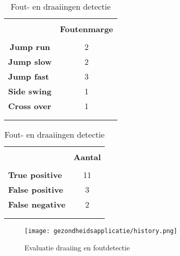 \begin{table}[!htpd]
\parbox{.45\linewidth}{
    \centering
    \begin{tabular}{lc}
 \hline \\
    \multicolumn{1}{c}{\textbf{}}          & \textbf{Foutenmarge} \\
     \hline \\
    \multicolumn{1}{c}{\textbf{Jump run}}  & 2                    \\
    \multicolumn{1}{c}{\textbf{Jump slow}} & 2                    \\
    \textbf{Jump fast}                     & 3                    \\
    \textbf{Side swing}                    & 1                    \\
    \textbf{Cross over}                    & 1   \\\\
     \hline \\
    \end{tabular}
    \caption{Detectie draaiingen}
    \label{tab:draaiingen}
}
\hfill
\parbox{.45\linewidth}{
    \centering
   \begin{tabular}{lc}
 \hline \\
    \textbf{}               & \textbf{Aantal} \\
     \hline \\
    \textbf{True positive}  & 11                \\
    \textbf{False positive} & 3                  \\
    \textbf{False negative}  & 2               \\\\
     \hline \\
    \end{tabular}
    \caption{Fout- en draaiingen detectie}
    \label{tab:fouten}
}
\end{table}

\begin{figure}[!htpd]
\centering
\caption{Evaluatie draaiing en foutdetectie}\label{fig:evaluatie}
\texttt{[image: gezondheidsapplicatie/history.png]} 
\end{figure}

